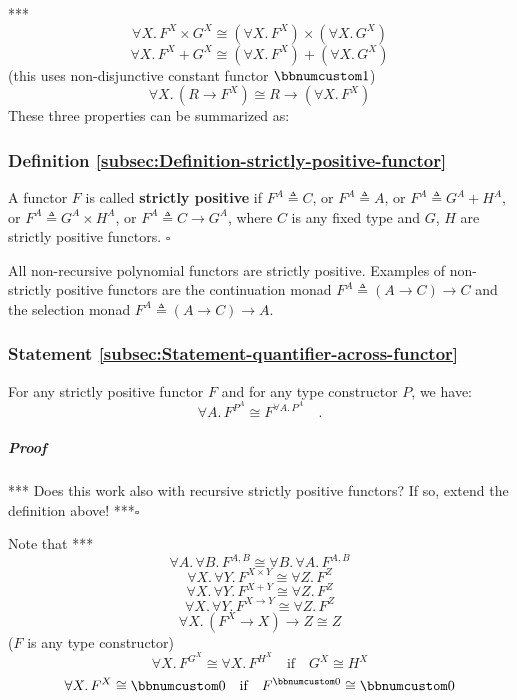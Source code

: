 {*}{*}{*}
\[
\forall X.\,F^{X}\times G^{X}\cong(\forall X.\,F^{X})\times(\forall X.\,G^{X})
\]
\[
\forall X.\,F^{X}+G^{X}\cong(\forall X.\,F^{X})+(\forall X.\,G^{X})
\]
(this uses non-disjunctive constant functor $\bbnum 1$)
\[
\forall X.\,(R\rightarrow F^{X})\cong R\rightarrow(\forall X.\,F^{X})
\]
These three properties can be summarized as:

\subsubsection{Definition \label{subsec:Definition-strictly-positive-functor}\ref{subsec:Definition-strictly-positive-functor}}

A functor $F$ is called \textbf{strictly
positive} if $F^{A}\triangleq C$, or $F^{A}\triangleq A$, or $F^{A}\triangleq G^{A}+H^{A}$,
or $F^{A}\triangleq G^{A}\times H^{A}$, or $F^{A}\triangleq C\rightarrow G^{A}$,
where $C$ is any fixed type and $G$, $H$ are strictly positive
functors. $\square$

All non-recursive polynomial functors are strictly positive. Examples
of non-strictly positive functors are the continuation monad $F^{A}\triangleq(A\rightarrow C)\rightarrow C$
and the selection monad $F^{A}\triangleq(A\rightarrow C)\rightarrow A$.

\subsubsection{Statement \label{subsec:Statement-quantifier-across-functor}\ref{subsec:Statement-quantifier-across-functor}}

For any strictly positive functor $F$ and for any type constructor
$P$, we have:
\[
\forall A.\,F^{P^{A}}\cong F^{\forall A.\,P^{A}}\quad.
\]


\subparagraph{Proof}

{*}{*}{*} Does this work also with recursive strictly positive functors?
If so, extend the definition above! {*}{*}{*}$\square$

Note that {*}{*}{*}
\[
\forall A.\,\forall B.\,F^{A,B}\cong\forall B.\,\forall A.\,F^{A,B}
\]
\[
\forall X.\,\forall Y.\,F^{X\times Y}\cong\forall Z.\,F^{Z}
\]
\[
\forall X.\,\forall Y.\,F^{X+Y}\cong\forall Z.\,F^{Z}
\]
\[
\forall X.\,\forall Y.\,F^{X\rightarrow Y}\cong\forall Z.\,F^{Z}
\]
\[
\forall X.\,(F^{X}\rightarrow X)\rightarrow Z\cong Z
\]
($F$ is any type constructor)
\[
\forall X.\,F^{G^{X}}\cong\forall X.\,F^{H^{X}}\quad\text{if}\quad G^{X}\cong H^{X}
\]
\[
\forall X.\,F^{X}\cong\bbnum 0\quad\text{if}\quad F^{\bbnum 0}\cong\bbnum 0
\]

